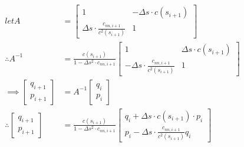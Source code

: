 \documentclass{article}
\begin{document}
\begin{align*}
	let A                                                       & = \begin{bmatrix} 1 & -\Delta s\cdot c(s_{i+1}) \\ \Delta s\cdot\frac{c_{nn,i+1}}{c^2(s_{i+1})} & 1 \end{bmatrix}                                                                      \\
	\therefore A^{-1}                                           & = \frac{c(s_{i+1})}{1 - \Delta s^2\cdot c_{nn, i+1}} \begin{bmatrix} 1 & \Delta s\cdot c(s_{i+1}) \\ -\Delta s\cdot\frac{c_{nn,i+1}}{c^2(s_{i+1})} & 1 \end{bmatrix}                   \\
	\implies \begin{bmatrix} q_{i+1} \\ p_{i+1} \end{bmatrix}   & = A^{-1}\begin{bmatrix}q_{i} \\ p_i \end{bmatrix}                                                                                                                                                                                   \\
	\therefore \begin{bmatrix} q_{i+1} \\ p_{i+1} \end{bmatrix} & = \frac{c(s_{i+1})}{1 - \Delta s^2\cdot c_{nn, i+1}}\begin{bmatrix} q_{i} + \Delta s\cdot c(s_{i+1})\cdot p_{i} \\ p_i -\Delta s\cdot \frac{c_{nn,i+1}}{c^2(s_{i+1})} q_i\end{bmatrix}
\end{align*}
\end{document}
